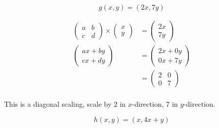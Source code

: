 \documentclass{tufte-handout}
\begin{document}
 


\begin{question}

\qpart
\qsubpart

\[ g(x,y) = (2x,7y) \]

\begin{align*}
    \begin{pmatrix}
        a & b \\
        c & d
    \end{pmatrix}
    \times
    \begin{pmatrix}
        x \\
        y
    \end{pmatrix}
    &=
    \begin{pmatrix}
        2x\\
        7y
    \end{pmatrix}\\[8pt]
    \begin{pmatrix}
        ax + by \\
        cx + dy
    \end{pmatrix}
    &=
    \begin{pmatrix}
        2x + 0y\\
        0x + 7y
    \end{pmatrix}\\[8pt]
    &=
    \begin{pmatrix}
        2 & 0 \\
        0 & 7
    \end{pmatrix}\\
\end{align*}

This is a diagonal scaling, scale by \( 2 \) in \( x‐ \)direction, \( 7 \) in \( y‐ \)direction.

\vspace{4cm}
\qsubpart

\[ h(x,y) = (x,4x+y) \]


\end{question}
\end{document}

